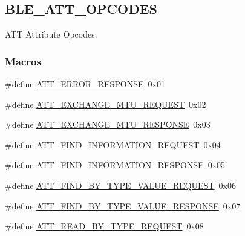 \hypertarget{group___b_l_e___a_t_t___o_p_c_o_d_e_s}{}\subsection{B\+L\+E\+\_\+\+A\+T\+T\+\_\+\+O\+P\+C\+O\+D\+ES}
\label{group___b_l_e___a_t_t___o_p_c_o_d_e_s}


A\+TT Attribute Opcodes.  


\subsubsection*{Macros}
\begin{DoxyCompactItemize}
\item 
\#define \hyperlink{group___b_l_e___a_t_t___o_p_c_o_d_e_s_ga85abbbf02c153180427b74bdb086a72f}{A\+T\+T\+\_\+\+E\+R\+R\+O\+R\+\_\+\+R\+E\+S\+P\+O\+N\+SE}~0x01
\item 
\#define \hyperlink{group___b_l_e___a_t_t___o_p_c_o_d_e_s_ga290f2c2ca3b3d80d9af9f609f6919825}{A\+T\+T\+\_\+\+E\+X\+C\+H\+A\+N\+G\+E\+\_\+\+M\+T\+U\+\_\+\+R\+E\+Q\+U\+E\+ST}~0x02
\item 
\#define \hyperlink{group___b_l_e___a_t_t___o_p_c_o_d_e_s_gaf9e41ca0c50db9c8e7d82f71744ff3c0}{A\+T\+T\+\_\+\+E\+X\+C\+H\+A\+N\+G\+E\+\_\+\+M\+T\+U\+\_\+\+R\+E\+S\+P\+O\+N\+SE}~0x03
\item 
\#define \hyperlink{group___b_l_e___a_t_t___o_p_c_o_d_e_s_gaac71facb546305c6639ed35eb5986de5}{A\+T\+T\+\_\+\+F\+I\+N\+D\+\_\+\+I\+N\+F\+O\+R\+M\+A\+T\+I\+O\+N\+\_\+\+R\+E\+Q\+U\+E\+ST}~0x04
\item 
\#define \hyperlink{group___b_l_e___a_t_t___o_p_c_o_d_e_s_ga4eee07a0b3e965b3f3df56aedfd1e21a}{A\+T\+T\+\_\+\+F\+I\+N\+D\+\_\+\+I\+N\+F\+O\+R\+M\+A\+T\+I\+O\+N\+\_\+\+R\+E\+S\+P\+O\+N\+SE}~0x05
\item 
\#define \hyperlink{group___b_l_e___a_t_t___o_p_c_o_d_e_s_ga11332c53d6634884b907979cb5d50bfe}{A\+T\+T\+\_\+\+F\+I\+N\+D\+\_\+\+B\+Y\+\_\+\+T\+Y\+P\+E\+\_\+\+V\+A\+L\+U\+E\+\_\+\+R\+E\+Q\+U\+E\+ST}~0x06
\item 
\#define \hyperlink{group___b_l_e___a_t_t___o_p_c_o_d_e_s_gaaf391241a64889d9a247671ed538b2c6}{A\+T\+T\+\_\+\+F\+I\+N\+D\+\_\+\+B\+Y\+\_\+\+T\+Y\+P\+E\+\_\+\+V\+A\+L\+U\+E\+\_\+\+R\+E\+S\+P\+O\+N\+SE}~0x07
\item 
\#define \hyperlink{group___b_l_e___a_t_t___o_p_c_o_d_e_s_ga255076b5dac1eb1a3de3c1450b3a2a55}{A\+T\+T\+\_\+\+R\+E\+A\+D\+\_\+\+B\+Y\+\_\+\+T\+Y\+P\+E\+\_\+\+R\+E\+Q\+U\+E\+ST}~0x08

\end{DoxyCompactItemize}
